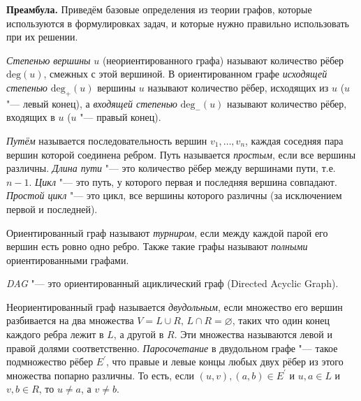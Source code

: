 \documentclass[12pt]{extreport}
\theoremstyle{definiton}
\theoremstyle{definition}
\theoremstyle{definition}
\let\es\varnothing
\def\prend{
	\bigskip
}
\begin{document}
	
	 \noindent\textbf{Преамбула.} Приведём базовые определения из теории графов, которые используются в формулировках задач, и которые нужно правильно использовать при их решении.

	\medskip

	\emph{Степенью вершины} $u$ (неориентированного графа) называют количество рёбер $\mathrm{deg}(u)$, смежных с этой вершиной. В ориентированном графе \emph{исходящей степенью} $\mathrm{deg}_{+}(u)$ вершины $u$ называют количество рёбер, исходящих из $u$ ($u$ "--- левый конец), а \emph{входящей степенью} $\mathrm{deg}_{-}(u)$ называют количество рёбер, входящих в $u$ ($u$ "--- правый конец). %

	\emph{Путём} называется последовательность вершин $v_1, \ldots, v_n$, каждая соседняя пара вершин которой соединена ребром. Путь называется \emph{простым}, если все вершины различны. \emph{Длина пути} "--- это количество рёбер между вершинами пути, т.е. $n-1$. \emph{Цикл} "--- это путь, у которого первая и последняя вершина совпадают. \emph{Простой цикл} "--- это цикл, все вершины которого различны (за исключением первой и последней).


	Ориентированный граф называют \emph{турниром}, если между каждой парой его вершин есть ровно одно ребро. Также такие графы называют \emph{полными} ориентированными графами. %

	\emph{DAG} "--- это ориентированный ациклический граф (Directed Acyclic Graph).

	Неориентированный граф называется \emph{двудольным}, если множество его вершин разбивается на два множества $V = L \cup R,\, L\cap R = \es$, таких что один конец каждого ребра лежит в $L$, а другой в $R$. Эти множества называются левой и правой долями соответственно. \emph{Паросочетание} в двудольном графе "--- такое подмножество рёбер $E^{\prime}$, что правые и левые концы любых двух рёбер из этого множества попарно различны.  То есть, если $(u,v), (a,b) \in E^{\prime}$ и $u,a \in L$ и $ v, b \in R$, то $u\neq a$, а $v \neq b$.


	\prend
\end{document}
